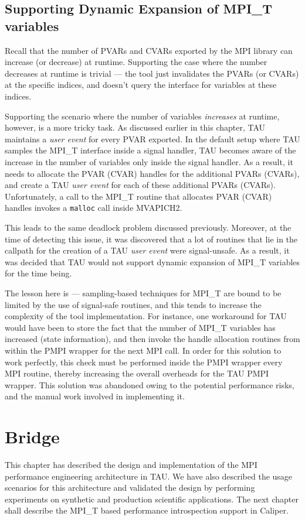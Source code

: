 \subsection {Supporting Dynamic Expansion of MPI\_T variables}
Recall that the number of PVARs and CVARs exported by the MPI library can increase (or decrease) at runtime. Supporting the case where the number decreases at runtime is trivial --- the tool just invalidates the PVARs (or CVARs) at the specific indices, and doesn't query the interface for variables at these indices.
\par Supporting the scenario where the number of variables \textit{increases} at runtime, however, is a more tricky task. As discussed earlier in this chapter, TAU maintains a \textit{user event} for every PVAR exported. In the default setup where TAU samples the MPI\_T interface inside a signal handler, TAU becomes aware of the increase in the number of variables only inside the signal handler. As a result, it needs to allocate the PVAR (CVAR) handles for the additional PVARs (CVARs), and create a TAU \textit{user event} for each of these additional PVARs (CVARs). Unfortunately, a call to the MPI\_T routine that allocates PVAR (CVAR) handles invokes a \verb+malloc+ call inside MVAPICH2. 
\par This leads to the same deadlock problem discussed previously. Moreover, at the time of detecting this issue, it was discovered that a lot of routines that lie in the callpath for the creation of a TAU \textit{user event} were signal-unsafe. As a result, it was decided that TAU would not support dynamic expansion of MPI\_T variables for the time being. 
\par The lesson here is --- sampling-based techniques for MPI\_T are bound to be limited by the use of signal-safe routines, and this tends to increase the complexity of the tool implementation. For instance, one workaround for TAU would have been to store the fact that the number of MPI\_T variables has increased (state information), and then invoke the handle allocation routines from within the PMPI wrapper for the next MPI call. In order for this solution to work perfectly, this check must be performed inside the PMPI wrapper every MPI routine, thereby increasing the overall overheads for the TAU PMPI wrapper. This solution was abandoned owing to the potential performance risks, and the manual work involved in implementing it.
\section{Bridge}
This chapter has described the design and implementation of the MPI performance engineering architecture in TAU. We have also described the usage scenarios for this architecture and validated the design by performing experiments on synthetic and production scientific applications. The next chapter shall describe the MPI\_T based performance introspection support in Caliper. 
